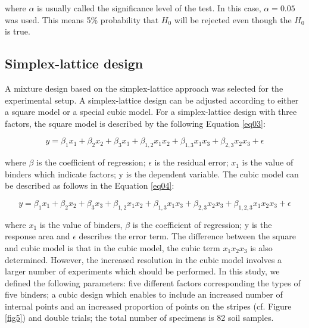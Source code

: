 \documentclass[constrmater,article,submit,pdftex,moreauthors]{Definitions/mdpi}
\begin{document}
where $\alpha$ is usually called the significance level of the test. In this case, $\alpha = 0.05 $ was used. This means 5\% probability that $H_0$ will be rejected even though the $H_0$ is true. 

\subsection{Simplex-lattice design}
A mixture design based on the simplex-lattice approach was selected for the experimental setup. A simplex-lattice design can be adjusted according to either a square model or a special cubic model.  For a simplex-lattice design with three factors, the square model is described by the following Equation \ref{eq03}:

\begin{equation}\label{eq03}
	y = \beta _1 x_1 +  \beta _2  x_2 +  \beta _3  x_3 + \beta _{1,2} x_1 x_2 + \beta _{1,3} x_1 x_3 + \beta _{2,3} x_2 x_3 + \epsilon
\end{equation}

where $\beta$ is the coefficient of regression; $\epsilon$ is the residual error; $x_1$ is the value of binders which indicate factors; y is the dependent variable. The cubic model can be described as follows in the Equation \ref{eq04}:

\begin{equation}\label{eq04}
	y = \beta _1 x_1 + \beta _2 x_2 + \beta _3 x_3 + \beta _{1,2} x_1 x_2 + \beta _{1,3} x_1 x_3 + \beta _{2,3} x_2 x_3  + \beta _{1,2,3} x_1 x_2 x_3 + \epsilon
\end{equation}

where $x_1$ is the value of binders, $\beta$ is the coefficient of regression; y is the response area and $\epsilon$ describes the error term.  The difference between the square and cubic model is that in the cubic model, the cubic term $x_1 x_2 x_3$ is also determined. However, the increased resolution in the cubic model involves a larger number of experiments which should be performed. In this study, we defined the following parameters: five different factors corresponding the types of five binders; a cubic design which enables to include an increased number of internal points and an increased proportion of points on the stripes (cf. Figure \ref{fig5}) and double trials; the total number of specimens is 82 soil samples.
\end{document}
